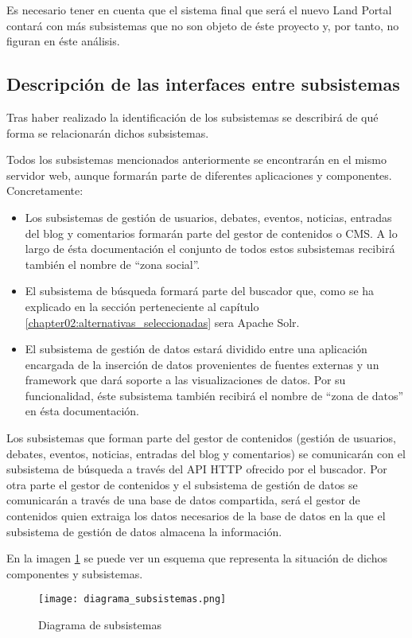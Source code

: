Es necesario tener en cuenta que el sistema final que será el nuevo Land Portal contará con más subsistemas que no son objeto de éste proyecto y, por tanto, no figuran en éste análisis.


\subsection{Descripción de las interfaces entre subsistemas}
Tras haber realizado la identificación de los subsistemas  se describirá de qué forma se relacionarán dichos subsistemas.

Todos los subsistemas mencionados anteriormente se encontrarán en el mismo servidor web, aunque formarán parte de diferentes aplicaciones y componentes.  Concretamente:
\begin{itemize}
\item Los subsistemas de gestión de usuarios, debates, eventos, noticias, entradas del blog y comentarios formarán parte del gestor de contenidos o CMS.  A lo largo de ésta documentación el conjunto de todos estos subsistemas recibirá también el nombre de ``zona social''.
\item El subsistema de búsqueda formará parte del buscador que, como se ha explicado en la sección  perteneciente al capítulo \ref{chapter02:alternativas_seleccionadas} sera Apache Solr.
\item El subsistema de gestión de datos estará dividido entre una aplicación encargada de la inserción de datos provenientes de fuentes externas y un framework que dará soporte a las visualizaciones de datos.  Por su funcionalidad, éste subsistema también recibirá el nombre de ``zona de datos'' en ésta documentación.
\end{itemize}

Los subsistemas que forman parte del gestor de contenidos (gestión de usuarios, debates, eventos, noticias, entradas del blog y comentarios) se comunicarán con el subsistema de búsqueda a través del API HTTP ofrecido por el buscador. \newline
Por otra parte el gestor de contenidos y el subsistema de gestión de datos se comunicarán a través de una base de datos compartida, será el gestor de contenidos quien extraiga los datos necesarios de la base de datos en la que el subsistema de gestión de datos almacena la información.

En la imagen \ref{fig:diagrama_subsistemas} se puede ver un esquema que representa la situación de dichos componentes y subsistemas.

\begin{figure}[h]
\centering
\texttt{[image: diagrama\_subsistemas.png]}
\caption{Diagrama de subsistemas}
\label{fig:diagrama_subsistemas}
\end{figure}